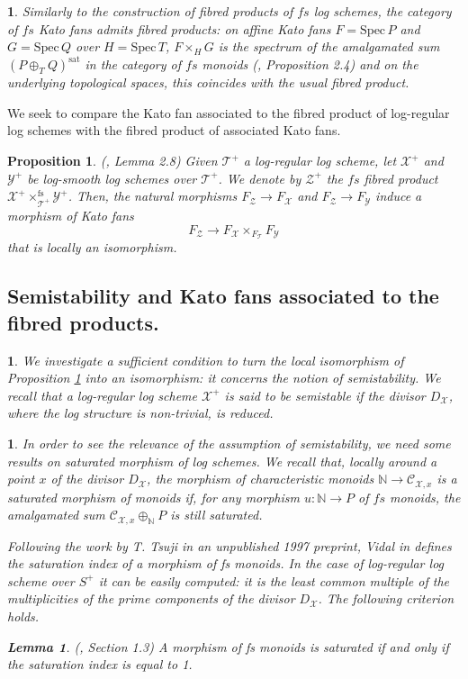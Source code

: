 \documentclass{amsart}%
\numberwithin{equation}{subsection}
\theoremstyle{plain2}
\newtheorem{lemma}[equation]{Lemma}
\newtheorem{prop}[equation]{Proposition}
\theoremstyle{definition2}
\theoremstyle{stepstyle}
\theoremstyle{point}
\theoremstyle{subpoint}
\newtheorem{subpoint}[equation]{}%
\newcommand{\spa}[1]{\begin{subpoint}#1\end{subpoint}}           %
\newcommand{\N}{\ensuremath{\mathbb{N}}}
\newcommand{\cX}{\ensuremath{\mathscr{X}}}
\newcommand{\caC}{\ensuremath{\mathcal{C}}}
\newcommand{\cY}{\ensuremath{\mathscr{Y}}}
\newcommand{\cZ}{\ensuremath{\mathscr{Z}}}
\renewcommand{\cZ}{\ensuremath{\mathscr{Z}}}
\renewcommand{\cY}{\ensuremath{\mathscr{Y}}}
\newcommand{\Spec}{\ensuremath{\mathrm{Spec}\,}}
\begin{document}
\spa{Similarly to the construction of fibred products of $fs$ log schemes, the category of $fs$ Kato fans admits fibred products: on affine Kato fans $F=\Spec P$ and $G=\Spec Q$ over $H=\Spec T$, $F\times_{H}G$ is the spectrum of the amalgamated sum $(P \oplus_T Q)^{\text{sat}}$ in the category of $fs$ monoids (\cite{Ulirsch2016}, Proposition 2.4) and on the underlying topological spaces, this coincides with the usual fibred product.}
We seek to compare the Kato fan associated to the fibred product of log-regular log schemes with the fibred product of associated Kato fans.
\begin{prop} \label{local isomo kato fan product}(\cite{Saito2004}, Lemma 2.8) Given $\mathscr{T}^+$ a log-regular log scheme, let $\cX^+$ and $\cY^+$ be log-smooth log schemes over $\mathscr{T}^+$. We denote by $\cZ^+$ the $fs$ fibred product $\cX^+\times^{\text{fs}}_{\mathscr{T}^+} \cY^+$. Then, the natural morphisms $F_{\cZ}\to F_{\cX}$ and $F_{\cZ}\to F_{\cY}$ induce a morphism of Kato fans $$F_{\cZ} \rightarrow F_{\cX} \times_{F_{\mathscr{T}}} F_{\cY}$$ that is locally an isomorphism.
\end{prop}

\subsection{Semistability and Kato fans associated to the fibred products.} 
\spa{We investigate a sufficient condition to turn the local isomorphism of Proposition \ref{local isomo kato fan product} into an isomorphism: it concerns the notion of semistability. We recall that a log-regular log scheme $\cX^+$ is said to be semistable if the divisor $D_{\cX}$, where the log structure is non-trivial, is reduced.}

\spa{In order to see the relevance of the assumption of semistability, we need some results on saturated morphism of log schemes. We recall that, locally around a point $x$ of the divisor $D_{\cX}$, the morphism of characteristic monoids $\N \rightarrow \caC_{\cX,x}$ is a saturated morphism of monoids if, for any morphism $u: \N \rightarrow P$ of $fs$ monoids, the amalgamated sum $\caC_{\cX,x} \oplus_{\N} P$ is still saturated.

Following the work by T. Tsuji in an unpublished 1997 preprint, Vidal in \cite{Vidal} defines the saturation index of a morphism of \emph{fs} monoids. In the case of log-regular log scheme over $S^+$ it can be easily computed: it is the least common multiple of the multiplicities of the prime components of the divisor $D_{\cX}$. The following criterion holds.
\begin{lemma} \label{lemma criterion saturation}(\cite{Vidal}, Section 1.3)
A morphism of fs monoids is saturated if and only if the saturation index is equal to 1.
\end{lemma}}
\end{document}
